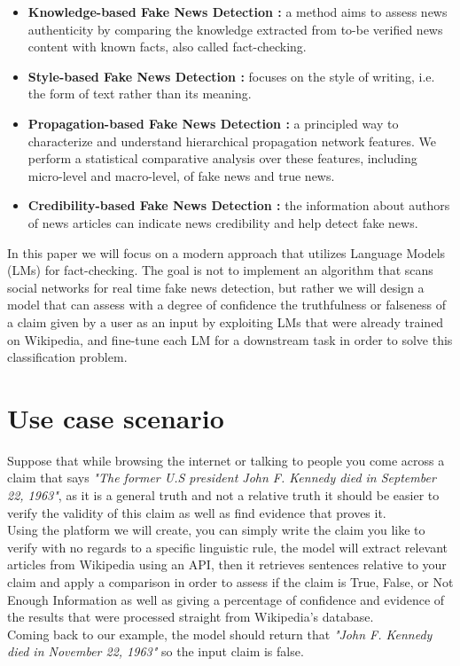 \documentclass[10pt, english]{report}
\begin{document}
\begin{itemize}
\item \textbf{Knowledge-based Fake News Detection \cite{chernyavskiy2021whatthewikifact}:} a method aims to assess news authenticity by comparing the knowledge extracted from to-be verified news content with known facts, also called fact-checking.
\item \textbf{Style-based Fake News Detection \cite{przybyla2020capturing}:} focuses on the style of writing, i.e. the form of text rather than its meaning.
\item \textbf{Propagation-based Fake News Detection \cite{shu2020hierarchical}:} a principled way to characterize and understand hierarchical propagation network features. We perform a statistical comparative analysis over these features, including micro-level and macro-level, of fake news and true news.
\item \textbf{Credibility-based Fake News Detection \cite{sitaula2020credibility}:} the information about authors of news articles can indicate news credibility and help detect fake news.
\end{itemize}

In this paper we will focus on a modern approach that utilizes Language Models (LMs) for fact-checking. The goal is not to implement an algorithm that scans social networks for real time fake news detection, but rather we will design a model that can assess with a degree of confidence the truthfulness or falseness of a claim given by a user as an input by exploiting LMs that were already trained on Wikipedia, and fine-tune each LM for a downstream task in order to solve this classification problem.

\section{Use case scenario}
Suppose that while browsing the internet or talking to people you come across a claim that says \textit{"The former U.S president John F. Kennedy died in September 22, 1963"}, as it is a general truth and not a relative truth it should be easier to verify the validity of this claim as well as find evidence that proves it.\\
Using the platform we will create, you can simply write the claim you like to verify with no regards to a specific linguistic rule, the model will extract relevant articles from Wikipedia using an API, then it retrieves sentences relative to your claim and apply a comparison in order to assess if the claim is True, False, or Not Enough Information as well as giving a percentage of confidence and evidence of the results that were processed straight from Wikipedia's database.\\
Coming back to our example, the model should return that \textit{"John F. Kennedy died in November 22, 1963"} so the input claim is false.
\end{document}
